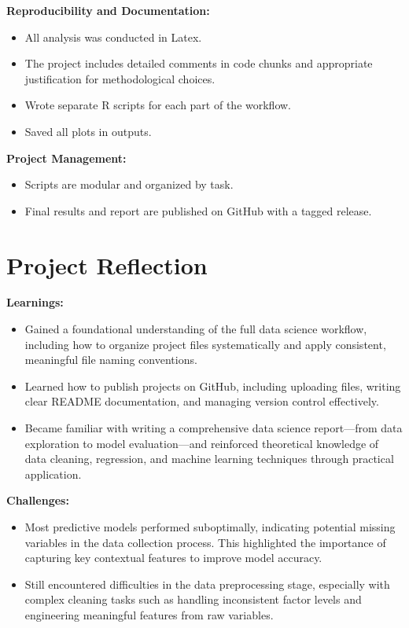 \documentclass[a4paper, 12pt]{article}
\begin{document}
\textbf{Reproducibility and Documentation:} 

\begin{itemize}
\item All analysis was conducted in Latex.
\item The project includes detailed comments in code chunks and appropriate justification for methodological choices.
\item Wrote separate R scripts for each part of the workflow.
\item Saved all plots in outputs.
\end{itemize}

\textbf{Project Management:} 

\begin{itemize}
\item Scripts are modular and organized by task.
\item Final results and report are published on GitHub with a tagged release.
\end{itemize}

\pagebreak

\section{Project Reflection}

\textbf{Learnings:}

\begin{itemize}
\item Gained a foundational understanding of the full data science workflow, including how to organize project files systematically and apply consistent, meaningful file naming conventions.
\item Learned how to publish projects on GitHub, including uploading files, writing clear README documentation, and managing version control effectively.
\item Became familiar with writing a comprehensive data science report—from data exploration to model evaluation—and reinforced theoretical knowledge of data cleaning, regression, and machine learning techniques through practical application.
\end{itemize}

\textbf{Challenges:}

\begin{itemize}
\item Most predictive models performed suboptimally, indicating potential missing variables in the data collection process. This highlighted the importance of capturing key contextual features to improve model accuracy.
\item Still encountered difficulties in the data preprocessing stage, especially with complex cleaning tasks such as handling inconsistent factor levels and engineering meaningful features from raw variables.
\end{itemize}
\end{document}
